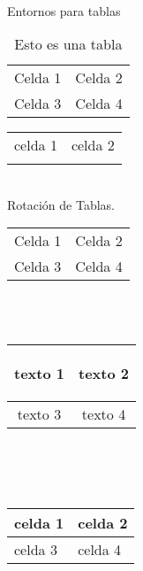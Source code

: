 \documentclass{article}
\begin{document}
\\ Entornos para tablas  \\
\begin{table}[h]
    \centering
    \begin{tabular}{|c|c|}
        \hline
        Celda 1 & Celda 2 \\
        Celda 3 & Celda 4 \\
        \hline
    \end{tabular}
    \caption{Esto es una tabla}
    \label{tab:mitabla}
\end{table}
\begin{tabular}{l!{\color{violet}\vrule}l}
    \hline
    celda 1 & celda 2 \\ 
     \hline
\end{tabular}
\\ Rotación de Tablas. \\
\begin{sideways}
    \begin{tabular}{|c|c|}
        \hline
        Celda 1 & Celda 2 \\
        Celda 3 & Celda 4 \\ \hline 
    \end{tabular}
\end{sideways}
\\ \\ 
\begin{tabular}{|c|c|}
    \hline
        texto 1 & \begin{sideways} texto 2 \end{sideways}\\ \hline
        texto 3 &  texto 4 \\ \hline
\end{tabular}
\\ \\ \\
{\setlength{\tabcolsep}{10mm}
{\setlength{\arrayrulewidth}{2mm}
\begin{tabular}{| l | l |}
    \hline
        celda 1 & celda 2\\
    \hline
        celda 3 & celda 4\\
    \hline
\end{tabular}
}}
\\ \\
\end{document}

